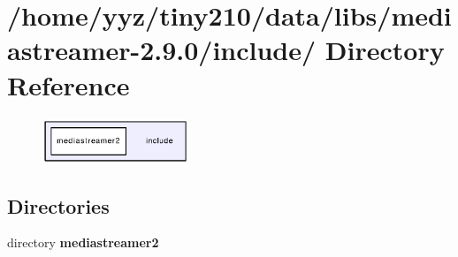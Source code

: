 \section{/home/yyz/tiny210/data/libs/mediastreamer-\/2.9.0/include/ Directory Reference}
\label{dir_3a9dcb44a7186746e7fb4c8db730348a}


\nopagebreak
\begin{figure}[H]
\begin{center}
\leavevmode
\includegraphics[width=124pt]{dir_3a9dcb44a7186746e7fb4c8db730348a_dep}
\end{center}
\end{figure}
\subsection*{Directories}
\begin{DoxyCompactItemize}
\item 
directory {\bf mediastreamer2}
\end{DoxyCompactItemize}
